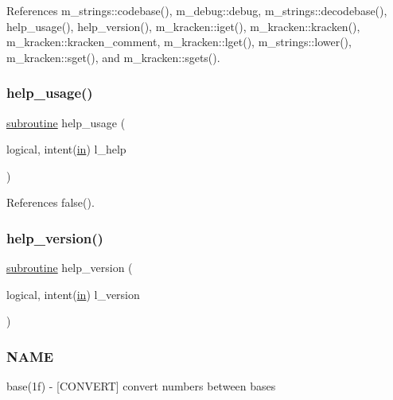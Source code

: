 References m\+\_\+strings\+::codebase(), m\+\_\+debug\+::debug, m\+\_\+strings\+::decodebase(), help\+\_\+usage(), help\+\_\+version(), m\+\_\+kracken\+::iget(), m\+\_\+kracken\+::kracken(), m\+\_\+kracken\+::kracken\+\_\+comment, m\+\_\+kracken\+::lget(), m\+\_\+strings\+::lower(), m\+\_\+kracken\+::sget(), and m\+\_\+kracken\+::sgets().

\mbox{\label{base_8f90_a3e09a3b52ee8fb04eeb93fe5761626a8}} 
\subsubsection{\texorpdfstring{help\+\_\+usage()}{help\_usage()}}
{\footnotesize\ttfamily \hyperlink{M__stopwatch_83_8txt_acfbcff50169d691ff02d4a123ed70482}{subroutine} help\+\_\+usage (\begin{DoxyParamCaption}\item[{logical, intent(\hyperlink{M__journal_83_8txt_afce72651d1eed785a2132bee863b2f38}{in})}]{l\+\_\+help }\end{DoxyParamCaption})}



References false().

\mbox{\label{base_8f90_a39c21619b08a3c22f19e2306efd7f766}} 
\subsubsection{\texorpdfstring{help\+\_\+version()}{help\_version()}}
{\footnotesize\ttfamily \hyperlink{M__stopwatch_83_8txt_acfbcff50169d691ff02d4a123ed70482}{subroutine} help\+\_\+version (\begin{DoxyParamCaption}\item[{logical, intent(\hyperlink{M__journal_83_8txt_afce72651d1eed785a2132bee863b2f38}{in})}]{l\+\_\+version }\end{DoxyParamCaption})}



\subsubsection*{N\+A\+ME}

base(1f) -\/ \mbox{[}C\+O\+N\+V\+E\+RT\mbox{]} convert numbers between bases

